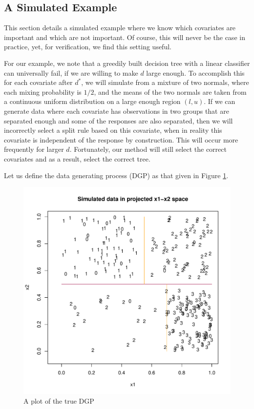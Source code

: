 \subsection{A Simulated Example}\label{sec:ase}

This section details a simulated example where we know which covariates are important and which are not important. Of course, this will never be the case in practice, yet, for verification, we find this setting useful. 

For our example, we note that a greedily built decision tree with a linear classifier can universally fail, if we are willing to make $d$ large enough. To accomplish this for each covariate after $d^*$, we will simulate from a mixture of two normals, where each mixing probability is $1/2$, and the means of the two normals are taken from a continuous uniform distribution on a large enough region $(l,u)$. If we can generate data where each covariate has observations in two groups that are separated enough and some of the responses are also separated, then we will incorrectly select a split rule based on this covariate, when in reality this covariate is independent of the response by construction. This will occur more frequently for larger $d$. Fortunately, our method will still select the correct covariates and as a result, select the correct tree.   

 Let us define the data generating process (DGP) as that given in Figure \ref{fig:awesome_image2}.  

\begin{figure}[h]
\centering
\label{fig:3fig_tree}
  \includegraphics[scale=0.4]{figures/proj_plot.pdf}
  \caption{A plot of the true DGP}\label{fig:awesome_image2}
\end{figure}

